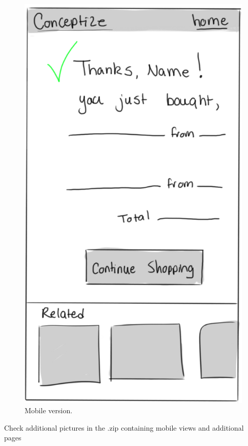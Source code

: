 \documentclass[]{article}
\begin{document}
\begin{enumerate}
		\begin{figure}
		  \includegraphics[width=\linewidth]{./pictures/confirmation_mobile.png}
		  \caption{Mobile version.}
		  \label{fig:mobile11}
		\end{figure}
	\end{enumerate}
	Check additional pictures in the .zip containing mobile views and additional pages
\end{document}

